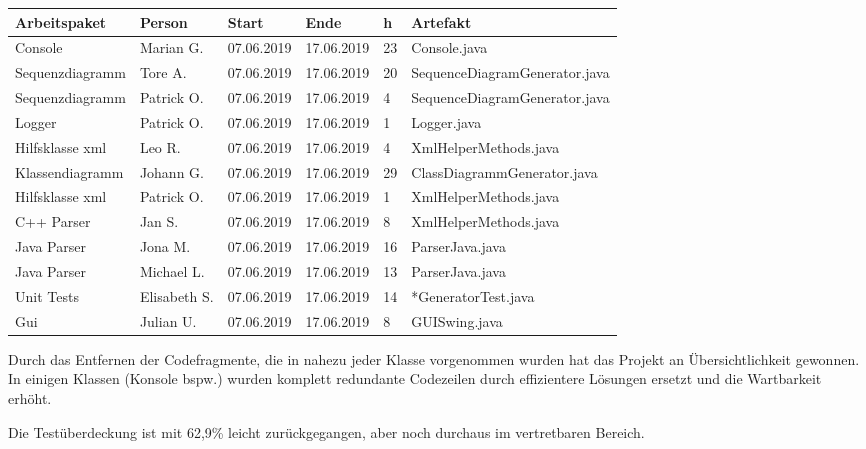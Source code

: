\begin{longtable}{|p{4cm}|l|l|l|l|l|}
        \hline
        Arbeitspaket & Person & Start & Ende & h & Artefakt\\
        \hline
        Console & Marian G. & 07.06.2019 & 17.06.2019 & 23 & Console.java\\ \hline
        Sequenzdiagramm & Tore A.  & 07.06.2019 & 17.06.2019  &20 & SequenceDiagramGenerator.java \\ \hline
        Sequenzdiagramm & Patrick O.  & 07.06.2019 & 17.06.2019  & 4  & SequenceDiagramGenerator.java \\ \hline
        Logger & Patrick O.  & 07.06.2019 & 17.06.2019  & 1  & Logger.java \\ \hline
        Hilfsklasse xml & Leo R.  & 07.06.2019 & 17.06.2019  & 4  & XmlHelperMethods.java \\ \hline
        Klassendiagramm & Johann G.  & 07.06.2019 & 17.06.2019  & 29 & ClassDiagrammGenerator.java \\ \hline
        Hilfsklasse xml  & Patrick O.  & 07.06.2019 & 17.06.2019  & 1 & XmlHelperMethods.java \\ \hline
        C++ Parser  & Jan S.  & 07.06.2019 & 17.06.2019  & 8 & XmlHelperMethods.java \\ \hline
        Java Parser  & Jona M.  & 07.06.2019 & 17.06.2019  & 16 & ParserJava.java \\ \hline
        Java Parser  & Michael L.  & 07.06.2019 & 17.06.2019  & 13 & ParserJava.java \\ \hline
        Unit Tests  & Elisabeth S.  & 07.06.2019 & 17.06.2019  & 14 & *GeneratorTest.java \\ \hline
        Gui  & Julian U. & 07.06.2019 & 17.06.2019  & 8 & GUISwing.java \\ \hline
\end{longtable}     
\nsecend

Durch das Entfernen der Codefragmente, die in nahezu jeder Klasse vorgenommen wurden hat das Projekt an Übersichtlichkeit gewonnen. In einigen Klassen (Konsole bspw.) wurden komplett redundante Codezeilen durch effizientere Lösungen ersetzt und die Wartbarkeit erhöht.
\nsecend%

Die Testüberdeckung ist mit 62,9\% leicht zurückgegangen, aber noch durchaus im vertretbaren Bereich.
\nsecend%

